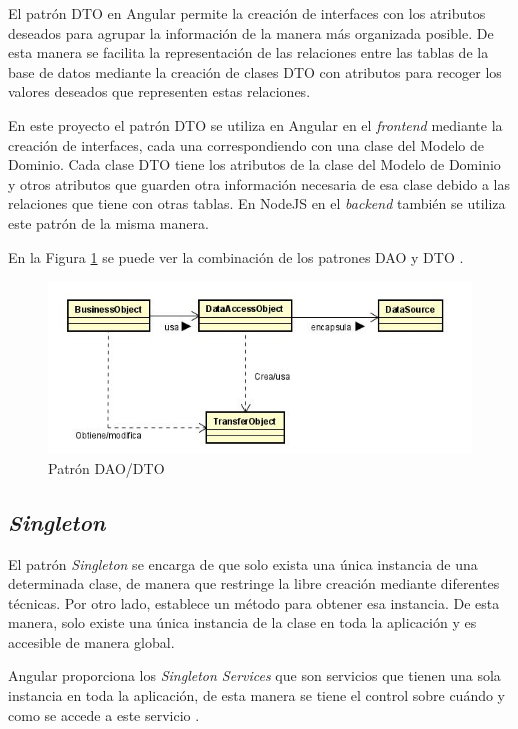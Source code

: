  El patrón DTO en Angular permite la creación de interfaces con los atributos deseados para agrupar la información de la manera más organizada posible. De esta manera se facilita la representación de las relaciones entre las tablas de la base de datos mediante la creación de clases DTO con atributos para recoger los valores deseados que representen estas relaciones.  
 
 En este proyecto el patrón DTO se utiliza en Angular en el \textit{frontend} mediante la creación de interfaces, cada una correspondiendo con una clase del Modelo de Dominio. Cada clase DTO tiene los atributos de la clase del Modelo de Dominio y otros atributos que guarden otra información necesaria de esa clase debido a las relaciones que tiene con otras tablas. En NodeJS en el \textit{backend} también se utiliza este patrón de la misma manera.
 
 En la Figura \ref{fig:patrondaodto} se puede ver la combinación de los patrones DAO y DTO \cite{yania}.
 
 \begin{figure}[H]
     \centering
     \includegraphics[scale=0.7]{img/dao-nuevo.jpg}
     \caption{Patrón DAO/DTO}
     \label{fig:patrondaodto}
 \end{figure}
 
 \subsection{\textit{Singleton}}
 El patrón \textit{Singleton} \cite{Singleton} se encarga de que solo exista una única instancia de una determinada clase, de manera que restringe la libre creación mediante diferentes técnicas. Por otro lado, establece un método para obtener esa instancia. De esta manera, solo existe una única instancia de la clase en toda la aplicación y es accesible de manera global.
 
 Angular proporciona los \textit{Singleton Services} que son servicios que tienen una sola instancia en toda la aplicación, de esta manera se tiene el control sobre cuándo y como se accede a este servicio \cite{Singleton-Services}. 
 
